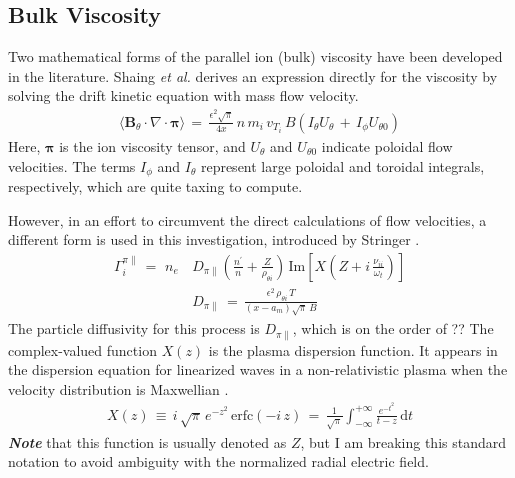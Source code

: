 \subsection{Bulk Viscosity}\label{ssec:bulk_viscosity}
Two mathematical forms of the parallel ion (bulk) viscosity have been developed in the literature.
Shaing \emph{et al.} \cite{shaing_bifurcation_1990} derives an expression directly for the viscosity by solving the drift kinetic equation with mass flow velocity.
\begin{align}%
	\langle \mathbf{B}_\theta \cdot \nabla \cdot \boldsymbol{\pi} \rangle \,=\,
		\frac{\epsilon^2 \sqrt{\pi}}{4 x} \, n\,m_i\,v_{T_i}\,B
		\left(I_\theta U_\theta \,+\, I_\phi U_{\theta 0}\right)
		\label{eq:shaing_bulk}
\end{align}
Here, $\boldsymbol{\pi}$ is the ion viscosity tensor, and $U_\theta$ and $U_{\theta 0}$ indicate poloidal flow velocities.
The terms $I_\phi$ and $I_\theta$ represent large poloidal and toroidal integrals, respectively, which are quite taxing to compute.

However, in an effort to circumvent the direct calculations of flow velocities, a different form is used in this investigation, introduced by Stringer \cite{stringer_explanation_1993}.
\begin{align} %
	\Gamma_i^{\pi\parallel} \,=\, \,n_e\,&D_{\pi\parallel}
		\left(\frac{n^\prime}{n} + \frac{Z}{\rho_{\theta i}}\right) \,
		\text{Im}\left[X\left(Z + i\,\frac{\nu_{ii}}{\omega_t}\right)\right]
		\label{eq:stringer_Gamma_bulk} \\
	&D_{\pi\parallel} \,=\, \frac{\epsilon^2\,\rho_{\theta i}\,T}
		{(x - a_m)\sqrt{\pi}\,B} \label{eq:stringer_D_bulk}
\end{align}
The particle diffusivity for this process is $D_{\pi\parallel}$, which is on the order of ?? 
The complex-valued function $X(z)$ is the plasma dispersion function.
It appears in the dispersion equation for linearized waves in a non-relativistic plasma when the velocity distribution is Maxwellian \cite{fried_plasma_2015}.
\begin{align} %
	X(z) \,\equiv\, i\,\sqrt{\pi} \, e^{-z^2} \, \text{erfc}(-i\,z) \,=\,
		\frac{1}{\sqrt{\pi}} \int_{-\infty}^{+\infty} \frac{e^{-t^2}}{t - z}
		\, \text{d}t \label{eq:plasma_disp}
\end{align}
\emph{\textbf{Note}} that this function is usually denoted as $Z$, but I am breaking this standard notation to avoid ambiguity with the normalized radial electric field.


